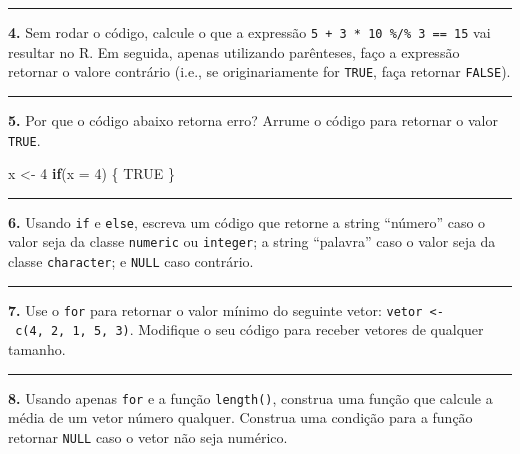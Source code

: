 \documentclass[]{book}
\newenvironment{Shaded}{\begin{snugshade}}{\end{snugshade}}
\newcommand{\ControlFlowTok}[1]{\textcolor[rgb]{0.13,0.29,0.53}{\textbf{#1}}}
\newcommand{\DataTypeTok}[1]{\textcolor[rgb]{0.13,0.29,0.53}{#1}}
\newcommand{\DecValTok}[1]{\textcolor[rgb]{0.00,0.00,0.81}{#1}}
\newcommand{\NormalTok}[1]{#1}
\newcommand{\OtherTok}[1]{\textcolor[rgb]{0.56,0.35,0.01}{#1}}
\newcommand{\StringTok}[1]{\textcolor[rgb]{0.31,0.60,0.02}{#1}}
\begin{document}
\begin{center}\rule{0.5\linewidth}{\linethickness}\end{center}

\textbf{4.} Sem rodar o código, calcule o que a expressão \texttt{5\ +\ 3\ *\ 10\ \%/\%\ 3\ ==\ 15} vai resultar no R. Em seguida, apenas utilizando parênteses, faço a expressão retornar o valore contrário (i.e., se originariamente for \texttt{TRUE}, faça retornar \texttt{FALSE}).

\begin{center}\rule{0.5\linewidth}{\linethickness}\end{center}

\textbf{5.} Por que o código abaixo retorna erro? Arrume o código para retornar o valor \texttt{TRUE}.

\begin{Shaded}
\begin{Highlighting}[]
\NormalTok{x <-}\StringTok{ }\DecValTok{4}
\ControlFlowTok{if}\NormalTok{(}\DataTypeTok{x =} \DecValTok{4}\NormalTok{) \{}
  \OtherTok{TRUE}
\NormalTok{\}}
\end{Highlighting}
\end{Shaded}

\begin{center}\rule{0.5\linewidth}{\linethickness}\end{center}

\textbf{6.} Usando \texttt{if} e \texttt{else}, escreva um código que retorne a string ``número'' caso o valor seja da classe \texttt{numeric} ou \texttt{integer}; a string ``palavra'' caso o valor seja da classe \texttt{character}; e \texttt{NULL} caso contrário.

\begin{center}\rule{0.5\linewidth}{\linethickness}\end{center}

\textbf{7.} Use o \texttt{for} para retornar o valor mínimo do seguinte vetor: \texttt{vetor\ \textless{}-\ c(4,\ 2,\ 1,\ 5,\ 3)}. Modifique o seu código para receber vetores de qualquer tamanho.

\begin{center}\rule{0.5\linewidth}{\linethickness}\end{center}

\textbf{8.} Usando apenas \texttt{for} e a função \texttt{length()}, construa uma função que calcule a média de um vetor número qualquer. Construa uma condição para a função retornar \texttt{NULL} caso o vetor não seja numérico.
\end{document}
